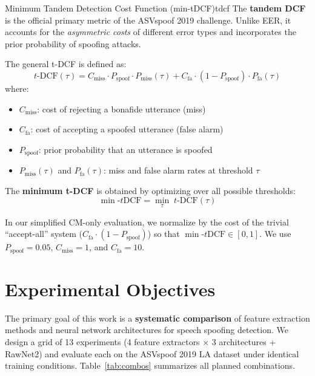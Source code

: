 \documentclass[12pt]{report}
\begin{document}
\begin{dfnbox}{Minimum Tandem Detection Cost Function (min-tDCF)}{tdcf}
    The \textbf{tandem DCF} is the official primary metric of the ASVspoof 2019 challenge.
    Unlike EER, it accounts for the \emph{asymmetric costs} of different error types and
    incorporates the prior probability of spoofing attacks.

    The general t-DCF is defined as:
    \begin{equation}
        t\text{-DCF}(\tau) = C_{\text{miss}} \cdot P_{\text{spoof}} \cdot P_{\text{miss}}(\tau)
                    + C_{\text{fa}} \cdot (1-P_{\text{spoof}}) \cdot P_{\text{fa}}(\tau)
        \label{eq:tdcf}
    \end{equation}
    where:
    \begin{itemize}[noitemsep]
        \item $C_{\text{miss}}$: cost of rejecting a bonafide utterance (miss)
        \item $C_{\text{fa}}$: cost of accepting a spoofed utterance (false alarm)
        \item $P_{\text{spoof}}$: prior probability that an utterance is spoofed
        \item $P_{\text{miss}}(\tau)$ and $P_{\text{fa}}(\tau)$: miss and false alarm rates at threshold $\tau$
    \end{itemize}

    The \textbf{minimum t-DCF} is obtained by optimizing over all possible thresholds:
    \begin{equation}
        \min\text{-}t\text{DCF} = \min_{\tau} \; t\text{-DCF}(\tau)
    \end{equation}

    In our simplified CM-only evaluation, we normalize by the cost of the trivial
    ``accept-all'' system ($C_{\text{fa}} \cdot (1 - P_{\text{spoof}})$) so that
    $\min\text{-}t\text{DCF} \in [0, 1]$. We use $P_{\text{spoof}} = 0.05$,
    $C_{\text{miss}} = 1$, and $C_{\text{fa}} = 10$.
\end{dfnbox}

\section{Experimental Objectives}

The primary goal of this work is a \textbf{systematic comparison} of feature extraction methods
and neural network architectures for speech spoofing detection. We design a grid of 13 experiments
(4 feature extractors $\times$ 3 architectures + RawNet2) and evaluate each on the ASVspoof 2019 LA
dataset under identical training conditions. Table~\ref{tab:combos} summarizes all planned combinations.
\end{document}
